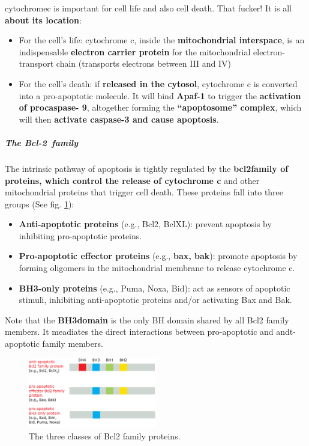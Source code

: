 \documentclass[../main.tex]{subfiles}
\begin{document}
\begin{RemarkWithTitel}{\gls{cytochromec} is important for cell life and also cell death. That fucker!}
	It is all \textbf{about its location}: 
	\begin{itemize}
		\item For the cell’s life: cytochrome c, inside the \textbf{mitochondrial interspace}, is an indispensable \textbf{electron carrier protein} for the mitochondrial electron-transport chain (transports electrons between III and IV)
		
		\item For the cell’s death: if \textbf{released in the cytosol}, cytochrome c is converted into a pro-apoptotic molecule. It will bind \textbf{Apaf-1} to trigger the \textbf{activation of procaspase- 9}, altogether forming the \textbf{“apoptosome” complex}, which will then \textbf{activate caspase-3  and cause apoptosis}.
	\end{itemize}
\end{RemarkWithTitel}

\subparagraph{The Bcl-2~family}
The intrinsic pathway of apoptosis is tightly regulated by the \textbf{\gls{bcl2family} of proteins, which control the release of cytochrome c }and other mitochondrial proteins that trigger cell death. These proteins fall into three groups (See fig. \ref{Bcl-2-family}):
\begin{itemize}
	\item \textbf{Anti-apoptotic proteins} (e.g., Bcl2, BclXL): prevent apoptosis by inhibiting pro-apoptotic proteins.
	
	\item \textbf{Pro-apoptotic effector proteins} (e.g., \textbf{\gls{bax}, \gls{bak}}): promote apoptosis by forming oligomers in the mitochondrial membrane to release cytochrome c.
	
	\item \textbf{BH3-only proteins} (e.g., Puma, Noxa, Bid): act as sensors of apoptotic stimuli, inhibiting anti-apoptotic proteins and/or activating Bax and Bak.
\end{itemize}
Note that the \textbf{\gls{BH3domain}} is the only BH domain shared by all Bcl2 family members. It meadiates the direct interactions between pro-apoptotic and andt-apoptotic family members. 

\begin{figure}[H]
	\centering
	\includegraphics[width = 0.5\textwidth]{10}
	\caption{The three classes of Bcl2 family proteins.}
	\label{Bcl-2-family}
\end{figure}
\end{document}
